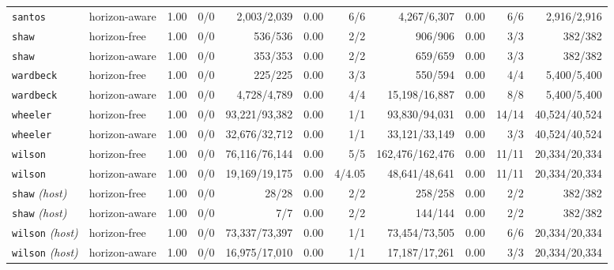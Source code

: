 \begin{table}[t]
\begin{tabular}{llrrrrrrrrr}
\texttt{santos} & horizon-aware & 1.00 & 0/0 & 2{,}003/2{,}039 & 0.00 & 6/6 & 4{,}267/6{,}307 & 0.00 & 6/6 & 2{,}916/2{,}916 \\
\texttt{shaw} & horizon-free & 1.00 & 0/0 & 536/536 & 0.00 & 2/2 & 906/906 & 0.00 & 3/3 & 382/382 \\
\texttt{shaw} & horizon-aware & 1.00 & 0/0 & 353/353 & 0.00 & 2/2 & 659/659 & 0.00 & 3/3 & 382/382 \\
\texttt{wardbeck} & horizon-free & 1.00 & 0/0 & 225/225 & 0.00 & 3/3 & 550/594 & 0.00 & 4/4 & 5{,}400/5{,}400 \\
\texttt{wardbeck} & horizon-aware & 1.00 & 0/0 & 4{,}728/4{,}789 & 0.00 & 4/4 & 15{,}198/16{,}887 & 0.00 & 8/8 & 5{,}400/5{,}400 \\
\texttt{wheeler} & horizon-free & 1.00 & 0/0 & 93{,}221/93{,}382 & 0.00 & 1/1 & 93{,}830/94{,}031 & 0.00 & 14/14 & 40{,}524/40{,}524 \\
\texttt{wheeler} & horizon-aware & 1.00 & 0/0 & 32{,}676/32{,}712 & 0.00 & 1/1 & 33{,}121/33{,}149 & 0.00 & 3/3 & 40{,}524/40{,}524 \\
\texttt{wilson} & horizon-free & 1.00 & 0/0 & 76{,}116/76{,}144 & 0.00 & 5/5 & 162{,}476/162{,}476 & 0.00 & 11/11 & 20{,}334/20{,}334 \\
\texttt{wilson} & horizon-aware & 1.00 & 0/0 & 19{,}169/19{,}175 & 0.00 & 4/4.05 & 48{,}641/48{,}641 & 0.00 & 11/11 & 20{,}334/20{,}334 \\
\texttt{shaw} \emph{(host)} & horizon-free & 1.00 & 0/0 & 28/28 & 0.00 & 2/2 & 258/258 & 0.00 & 2/2 & 382/382 \\
\texttt{shaw} \emph{(host)} & horizon-aware & 1.00 & 0/0 & 7/7 & 0.00 & 2/2 & 144/144 & 0.00 & 2/2 & 382/382 \\
\texttt{wilson} \emph{(host)} & horizon-free & 1.00 & 0/0 & 73{,}337/73{,}397 & 0.00 & 1/1 & 73{,}454/73{,}505 & 0.00 & 6/6 & 20{,}334/20{,}334 \\
\texttt{wilson} \emph{(host)} & horizon-aware & 1.00 & 0/0 & 16{,}975/17{,}010 & 0.00 & 1/1 & 17{,}187/17{,}261 & 0.00 & 3/3 & 20{,}334/20{,}334 \\
\bottomrule
\end{tabular}
\end{table}
